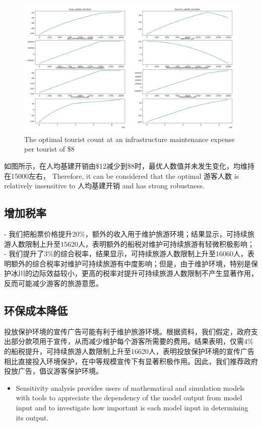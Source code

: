 \documentclass[12pt]{article}  %
\begin{document}
 
 \begin{figure}[H]  %
 
 \centering  %
 \includegraphics[width=.9\textwidth]{sensitivity8.png} %
 \caption{The optimal tourist count at an infrastructure maintenance expense per tourist of \$8} %
 \label{figy}%
 \end{figure}

 如图所示，在人均基建开销由\$12减少到\$8时，最优人数值并未发生变化，均维持在15000左右，
 Therefore, it can be considered that the optimal 游客人数 is relatively insensitive to 人均基建开销 and has strong robustness. 
 \subsection{增加税率}
 - 我们把船票价格提升20\%，额外的收入用于维护旅游环境；结果显示，可持续旅游人数限制上升至15620人，表明额外的船税对维护可持续旅游有轻微积极影响；
   - 我们提升了3\%的综合税率，结果显示，可持续旅游人数限制上升至16060人，表明额外的综合税率对维护可持续旅游有中度影响；但是，由于维护环境，特别是保护冰川的边际效益较小，更高的税率对提升可持续旅游人数限制不产生显著作用，反而可能减少游客的旅游意愿。
 \subsection{环保成本降低}
 投放保护环境的宣传广告可能有利于维护旅游环境。根据资料，我们假定，政府支出部分款项用于宣传，从而减少维护每个游客所需要的费用。结果表明，仅需4\%的船税提升，可持续旅游人数限制上升至16620人，表明投放保护环境的宣传广告相比直接投入环境保护，在中等规模宣传下有显著积极作用。因此，我们推荐政府投放广告，倡议游客保护环境。
 \begin{itemize}
     \setlength{\parsep}{0ex} %
     \setlength{\topsep}{2ex} %
     \setlength{\itemsep}{1ex} %
     \item Sensitivity analysis provides users of mathematical and simulation models with tools to appreciate the dependency of the model output from model input and to investigate how important is each model input in determining its output.
 \end{itemize}
 
\end{document}
